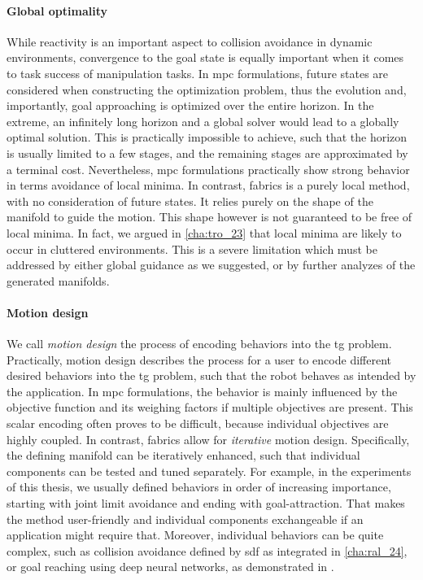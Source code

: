 \paragraph{Global optimality}
\label{par:discussion_global_optimality}

While reactivity is an important aspect to collision
avoidance in dynamic environments, convergence to the goal
state is equally important when it comes to task success of
manipulation tasks. In \ac{mpc} formulations, future states
are considered when constructing the optimization problem,
thus the evolution and, importantly, goal approaching is
optimized over the entire horizon. In the extreme, an
infinitely long horizon and a global solver would lead to a globally optimal
solution. This is practically impossible to achieve, such
that the horizon is usually limited to a few stages, and the
remaining stages are approximated by a terminal cost.
Nevertheless, \ac{mpc} formulations practically show strong 
behavior in terms avoidance of local minima. In contrast,
\ac{fabrics} is a purely local method, with no consideration
of future states. It relies purely on the shape of the
manifold to guide the motion. This shape however is not
guaranteed to be free of local minima. In fact, we argued in 
\cref{cha:tro_23} that local minima are likely to occur in
cluttered environments. This is a severe limitation which
must be addressed by either global guidance as we suggested,
or by further analyzes of the generated manifolds.

\paragraph{Motion design}
\label{par:motion_design}

We call \textit{motion design} the process of encoding
behaviors into the \ac{tg} problem. Practically, motion
design describes the 
process for a user to encode different desired behaviors
into the \ac{tg} problem, such that the robot behaves as
intended by the application. In \ac{mpc} formulations,
the behavior is mainly influenced by the objective function
and its weighing factors if multiple objectives are present.
This scalar encoding often proves to be difficult, because
individual objectives are highly coupled. In contrast,
\ac{fabrics} allow for \textit{iterative} motion design.
Specifically, the defining manifold can be iteratively
enhanced, such that individual components can be tested and
tuned separately. For example, in the experiments of this
thesis, we usually defined behaviors in order of
increasing importance, starting with joint limit avoidance
and ending with goal-attraction. That makes the method
user-friendly and individual components exchangeable if an
application might require that. Moreover, individual
behaviors can be quite complex, such as collision avoidance
defined by \ac{sdf} as integrated in \cref{cha:ral_24},
or goal reaching using
deep neural networks, as demonstrated in \cite{xie2023neural}.

